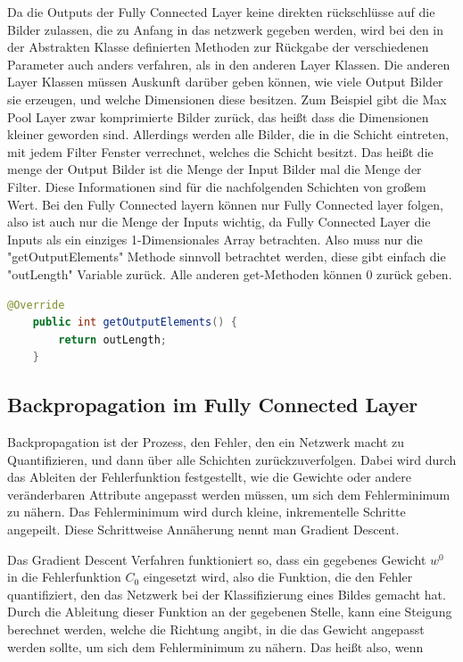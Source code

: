 \documentclass[12pt]{article}
\begin{document}
Da die Outputs der Fully Connected Layer keine direkten rückschlüsse auf die Bilder zulassen, die zu Anfang in das netzwerk gegeben werden, wird bei den in der Abstrakten Klasse definierten Methoden zur Rückgabe der verschiedenen Parameter auch anders verfahren, als in den anderen Layer Klassen. Die anderen Layer Klassen müssen Auskunft darüber geben können, wie viele Output Bilder sie erzeugen, und welche Dimensionen diese besitzen. Zum Beispiel gibt die Max Pool Layer zwar komprimierte Bilder zurück, das heißt dass die Dimensionen kleiner geworden sind. Allerdings werden alle Bilder, die in die Schicht eintreten, mit jedem Filter Fenster verrechnet, welches die Schicht besitzt. Das heißt die menge der Output Bilder ist die Menge der Input Bilder mal die Menge der Filter. Diese Informationen sind für die nachfolgenden Schichten von großem Wert. Bei den Fully Connected layern können nur Fully Connected layer folgen, also ist auch nur die Menge der Inputs wichtig, da Fully Connected Layer die Inputs als ein einziges 1-Dimensionales Array betrachten. Also muss nur die "getOutputElements" Methode sinnvoll betrachtet werden, diese gibt einfach die "outLength" Variable zurück. Alle anderen get-Methoden können 0 zurück geben.

\begin{lstlisting}[language=Java] 
    @Override
    public int getOutputElements() {
        return outLength;
    }
\end{lstlisting} 

\subsection{Backpropagation im Fully Connected Layer}
Backpropagation ist der Prozess, den Fehler, den ein Netzwerk macht zu Quantifizieren, und dann über alle Schichten zurückzuverfolgen. Dabei wird durch das Ableiten der Fehlerfunktion festgestellt, wie die Gewichte oder andere veränderbaren Attribute angepasst werden müssen, um sich dem Fehlerminimum zu nähern. Das Fehlerminimum wird durch kleine, inkrementelle Schritte angepeilt. Diese Schrittweise Annäherung nennt man Gradient Descent. 

Das Gradient Descent Verfahren funktioniert so, dass ein gegebenes Gewicht $w^0$ in die Fehlerfunktion $C_0$ eingesetzt wird, also die Funktion, die den Fehler quantifiziert, den das Netzwerk bei der Klassifizierung eines Bildes gemacht hat. Durch die Ableitung dieser Funktion an der gegebenen Stelle, kann eine Steigung berechnet werden, welche die Richtung angibt, in die das Gewicht angepasst werden sollte, um sich dem Fehlerminimum zu nähern. 
Das heißt also, wenn 
\end{document}
